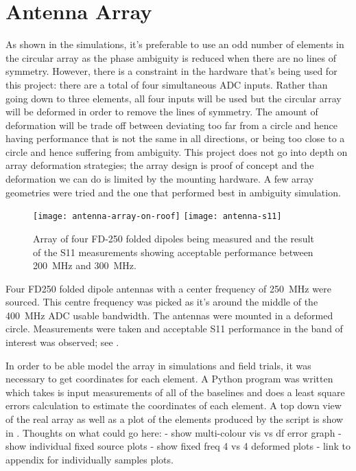 \section{Antenna Array}

As shown in the simulations, it's preferable to use an odd number of elements in the circular array as the phase ambiguity is reduced when there are no lines of symmetry. However, there is a constraint in the hardware that's being used for this project: there are a total of four simultaneous ADC inputs. Rather than going down to three elements, all four inputs will be used but the circular array will be deformed in order to remove the lines of symmetry. The amount of deformation will be trade off between deviating too far from a circle and hence having performance that is not the same in all directions, or being too close to a circle and hence suffering from ambiguity. This project does not go into depth on array deformation strategies; the array design is proof of concept and the deformation we can do is limited by the mounting hardware. A few array geometries were tried and the one that performed best in ambiguity simulation.

\begin{figure}
  \centering
  \texttt{[image: antenna-array-on-roof]}
  \texttt{[image: antenna-s11]}
  \caption{Array of four FD-250 folded dipoles being measured and the result of the S11 measurements showing acceptable performance between \SI{200}{\mega\hertz} and \SI{300}{\mega\hertz}.}
  \label{fig:rf-front-end:antenna-array-s11}
\end{figure}

Four FD250 folded dipole antennas with a center frequency of \SI{250}{\mega\hertz} were sourced. This centre frequency was picked as it's around the middle of the \SI{400}{\mega\hertz} ADC usable bandwidth. The antennas were mounted in a deformed circle. Measurements were taken and acceptable S11 performance in the band of interest was observed; see .

In order to be able model the array in simulations and field trials, it was necessary to get coordinates for each element. A Python program was written which takes is input measurements of all of the baselines and does a least square errors calculation to estimate the coordinates of each element. A top down view of the real array as well as a plot of the elements produced by the script is show in .
Thoughts on what could go here:
- show multi-colour vis vs df error graph
- show individual fixed source plots
- show fixed freq 4 vs 4 deformed plots
- link to appendix for individually samples plots.

